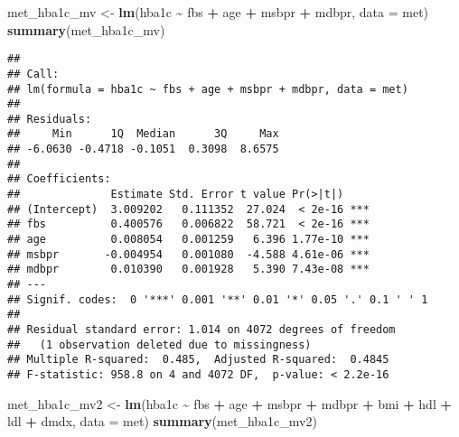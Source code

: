 \documentclass[
]{article}
\newenvironment{Shaded}{\begin{snugshade}}{\end{snugshade}}
\newcommand{\AttributeTok}[1]{\textcolor[rgb]{0.13,0.29,0.53}{#1}}
\newcommand{\FunctionTok}[1]{\textcolor[rgb]{0.13,0.29,0.53}{\textbf{#1}}}
\newcommand{\NormalTok}[1]{#1}
\newcommand{\OtherTok}[1]{\textcolor[rgb]{0.56,0.35,0.01}{#1}}
\newcommand{\SpecialCharTok}[1]{\textcolor[rgb]{0.81,0.36,0.00}{\textbf{#1}}}
\begin{document}
\begin{Shaded}
\begin{Highlighting}[]
\NormalTok{met\_hba1c\_mv }\OtherTok{\textless{}{-}} \FunctionTok{lm}\NormalTok{(hba1c }\SpecialCharTok{\textasciitilde{}}\NormalTok{ fbs }\SpecialCharTok{+}\NormalTok{ age }\SpecialCharTok{+}\NormalTok{ msbpr }\SpecialCharTok{+}\NormalTok{ mdbpr, }\AttributeTok{data =}\NormalTok{ met)}
\FunctionTok{summary}\NormalTok{(met\_hba1c\_mv)}
\end{Highlighting}
\end{Shaded}

\begin{verbatim}
## 
## Call:
## lm(formula = hba1c ~ fbs + age + msbpr + mdbpr, data = met)
## 
## Residuals:
##     Min      1Q  Median      3Q     Max 
## -6.0630 -0.4718 -0.1051  0.3098  8.6575 
## 
## Coefficients:
##              Estimate Std. Error t value Pr(>|t|)    
## (Intercept)  3.009202   0.111352  27.024  < 2e-16 ***
## fbs          0.400576   0.006822  58.721  < 2e-16 ***
## age          0.008054   0.001259   6.396 1.77e-10 ***
## msbpr       -0.004954   0.001080  -4.588 4.61e-06 ***
## mdbpr        0.010390   0.001928   5.390 7.43e-08 ***
## ---
## Signif. codes:  0 '***' 0.001 '**' 0.01 '*' 0.05 '.' 0.1 ' ' 1
## 
## Residual standard error: 1.014 on 4072 degrees of freedom
##   (1 observation deleted due to missingness)
## Multiple R-squared:  0.485,  Adjusted R-squared:  0.4845 
## F-statistic: 958.8 on 4 and 4072 DF,  p-value: < 2.2e-16
\end{verbatim}

\begin{Shaded}
\begin{Highlighting}[]
\NormalTok{met\_hba1c\_mv2 }\OtherTok{\textless{}{-}} \FunctionTok{lm}\NormalTok{(hba1c }\SpecialCharTok{\textasciitilde{}}\NormalTok{ fbs }\SpecialCharTok{+}\NormalTok{ age }\SpecialCharTok{+}\NormalTok{ msbpr }\SpecialCharTok{+}\NormalTok{ mdbpr }\SpecialCharTok{+}\NormalTok{ bmi }\SpecialCharTok{+}\NormalTok{ hdl }\SpecialCharTok{+}\NormalTok{ ldl }\SpecialCharTok{+}\NormalTok{ dmdx, }
                    \AttributeTok{data =}\NormalTok{ met)}
\FunctionTok{summary}\NormalTok{(met\_hba1c\_mv2)}
\end{Highlighting}
\end{Shaded}
\end{document}

